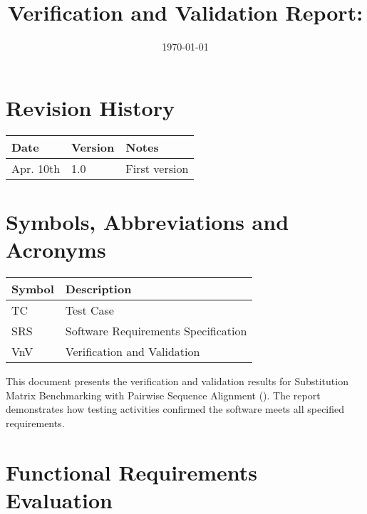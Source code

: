 \documentclass[12pt, titlepage]{article}
\begin{document}
\title{Verification and Validation Report: \progname} 
\author{\authname}
\date{\today}
	
\maketitle


\section{Revision History}

\begin{tabularx}{\textwidth}{p{3cm}p{2cm}X}
\toprule {\bf Date} & {\bf Version} & {\bf Notes}\\
\midrule
Apr. 10th & 1.0 & First version\\
\bottomrule
\end{tabularx}

\newpage

\section{Symbols, Abbreviations and Acronyms}

\renewcommand{\arraystretch}{1.2}
\begin{tabular}{l l} 
  \toprule		
  \textbf{Symbol} & \textbf{Description}\\
  \midrule 
  TC & Test Case\\
  SRS & Software Requirements Specification\\
  VnV & Verification and Validation\\
  \bottomrule
\end{tabular}

\newpage

\tableofcontents
\listoftables
\listoffigures

\newpage


This document presents the verification and validation results for Substitution Matrix Benchmarking with Pairwise Sequence Alignment (\progname). The report demonstrates how testing activities confirmed the software meets all specified requirements.

\section{Functional Requirements Evaluation}
\end{document}
